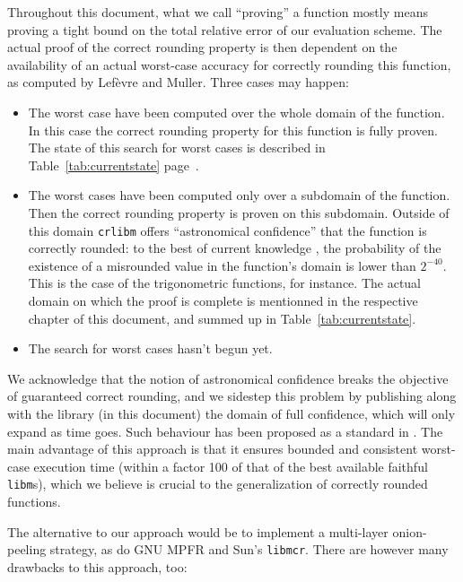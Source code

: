 Throughout this document, what we call ``proving'' a function mostly
means proving a tight bound on the total relative error of our
evaluation scheme. The actual proof of the correct rounding property
is then dependent on the availability of an actual worst-case accuracy
for correctly rounding this function, as computed by Lef\`evre and
Muller. Three cases may happen:
\begin{itemize}
\item The worst case have been computed over the whole domain of the
  function. In this case the correct rounding property for this
  function is fully proven. The state of this search for worst cases
  is described in Table~\ref{tab:currentstate}
  page~\pageref{tab:currentstate}.

\item The worst cases have been computed only over a subdomain of the
  function. Then the correct rounding property is proven on this
  subdomain. Outside of this domain \texttt{crlibm} offers
  ``astronomical confidence'' that the function is correctly rounded:
  to the best of current knowledge \cite{Gal86, DinErshGast2005}, the
  probability of the existence of a misrounded value in the function's
  domain is lower than $2^{-40}$. This is
  the case of the trigonometric functions, for instance. The
  actual domain on which the proof is complete is mentionned in the
  respective chapter of this document, and summed up in Table~\ref{tab:currentstate}.
\item The search for worst cases hasn't begun yet.
\end{itemize}

We acknowledge that the notion of astronomical confidence breaks the
objective of guaranteed correct rounding, and we sidestep this problem
by publishing along with the library (in this document) the domain of
full confidence, which will only expand as time goes.  Such behaviour
has been proposed as a standard in \cite{DefHanLefMulRevZim2004}.  The
main advantage of this approach is that it ensures bounded and
consistent worst-case execution time (within a factor 100 of that of
the best available faithful \texttt{libm}s), which we believe is
crucial to the generalization of correctly rounded functions.

The alternative to our approach would be to implement a
multi-layer onion-peeling strategy, as do GNU MPFR and Sun's
\texttt{libmcr}. There are however many drawbacks to this approach, too:

